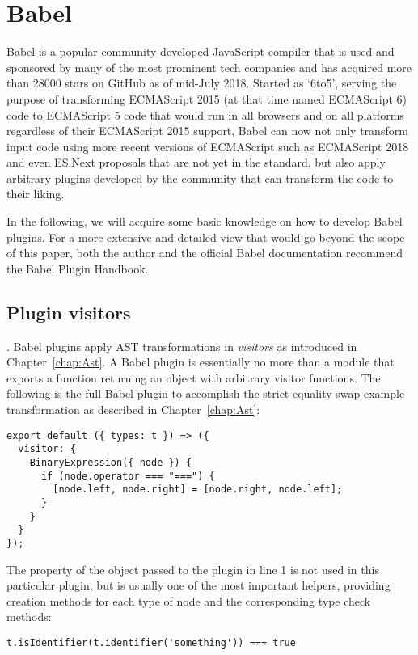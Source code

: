 \section{Babel}
Babel is a popular community-developed JavaScript compiler
that is used and sponsored by many of the most prominent tech companies
and has acquired more than 28000 stars on GitHub as of mid-July 2018.
\autocite{BabelGithub}
Started as `6to5', serving the purpose of transforming
ECMAScript 2015 (at that time named ECMAScript 6) code to
ECMAScript 5 code that would run in all browsers and on all platforms
regardless of their ECMAScript 2015 support,
Babel can now not only transform input code using
more recent versions of ECMAScript such as ECMAScript 2018
and even ES.Next proposals that are not yet in the standard,
but also apply arbitrary plugins developed by the community
that can transform the code to their liking.
\autocite{BabelPluginPrevalGithub}
\autocite{PowerAssertGithub}

In the following, we will acquire some basic knowledge on how to develop Babel plugins.
For a more extensive and detailed view that would go beyond the scope of this paper,
both the author and the official Babel documentation recommend the Babel Plugin Handbook.
\autocite{BabelPluginHandbook}

\subsection{Plugin visitors}.
Babel plugins apply AST transformations in \textit{visitors}
as introduced in Chapter~\ref{chap:Ast}.
A Babel plugin is essentially no more than a module that exports
a function returning an object with arbitrary visitor functions.
The following is the full Babel plugin to accomplish
the strict equality swap example transformation
as described in Chapter~\ref{chap:Ast}:
\begin{verbatim}
export default ({ types: t }) => ({
  visitor: {
    BinaryExpression({ node }) {
      if (node.operator === "===") {
        [node.left, node.right] = [node.right, node.left];
      }
    }
  }
});
\end{verbatim}

The  property of the object passed to the plugin
in line 1 is not used in this particular plugin,
but is usually one of the most important helpers,
providing creation methods for each type of node
and the corresponding type check methods:
\begin{verbatim}
t.isIdentifier(t.identifier('something')) === true
\end{verbatim}


